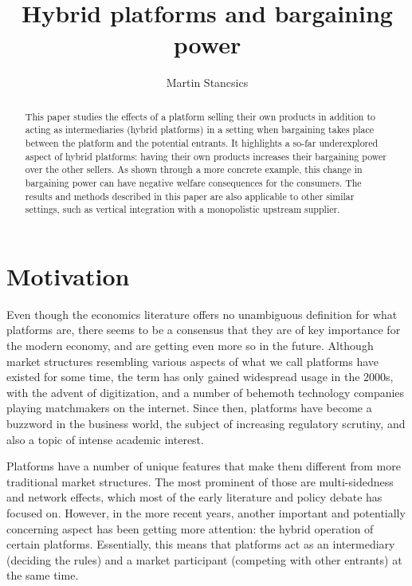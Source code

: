 \documentclass[a4paper]{article}
\title{Hybrid platforms and bargaining power}
\author{Martin Stancsics}
\begin{document}
\maketitle

\begin{abstract}
    This paper studies the effects of a platform selling their own products in addition to acting as intermediaries (hybrid platforms) in a setting when bargaining takes place between the platform and the potential entrants.
    It highlights a so-far underexplored aspect of hybrid platforms: having their own products increases their bargaining power over the other sellers.
    As shown through a more concrete example, this change in bargaining power can have negative welfare consequences for the consumers.
    The results and methods described in this paper are also applicable to other similar settings, such as vertical integration with a monopolistic upstream supplier.
\end{abstract}


\section{Motivation}

Even though the economics literature offers no unambiguous definition for what platforms are, there seems to be a consensus that they are of key importance for the modern economy, and are getting even more so in the future.
Although market structures resembling various aspects of what we call platforms have existed for some time, the term has only gained widespread usage in the 2000s, with the advent of digitization, and a number of behemoth technology companies playing matchmakers on the internet.
Since then, platforms have become a buzzword in the business world, the subject of increasing regulatory scrutiny, and also a topic of intense academic interest.

Platforms have a number of unique features that make them different from more traditional market structures.
The most prominent of those are multi-sidedness and network effects, which most of the early literature \parencite[for an overview, see][]{rochet2006two} and policy debate \parencite[e.g.][]{fletcher2021consumer,calvano2021market} has focused on.
However, in the more recent years, another important and potentially concerning aspect has been getting more attention: the hybrid operation of certain platforms.
Essentially, this means that platforms act as an intermediary (deciding the rules) and a market participant (competing with other entrants) at the same time.
\end{document}
